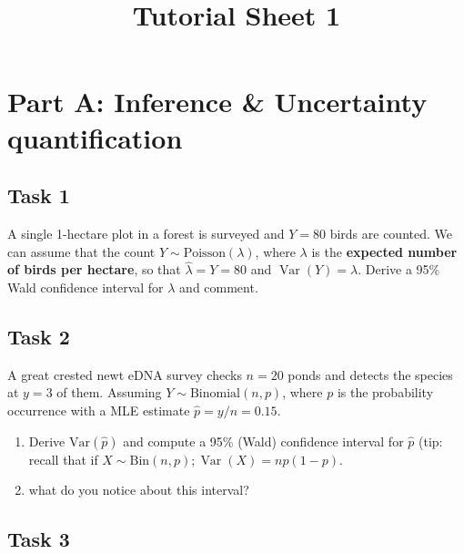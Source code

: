 \documentclass[
  letterpaper,
  DIV=11,
  numbers=noendperiod]{scrartcl}
\title{Tutorial Sheet 1}
\author{}
\date{}
\makeatletter
\providecommand{\tightlist}{%
  \setlength{\itemsep}{0pt}\setlength{\parskip}{0pt}}\usepackage{longtable,booktabs,array}
\renewcommand{\maketitle}{\bgroup\setlength{\parindent}{0pt}
\begin{flushleft}
  {\color{uniblue}\sffamily\huge\textbf{\@title}} \vspace{0.3cm} \newline
  {\Large {\@subtitle}} \newline
  \@author
\end{flushleft}\egroup
}
\makeatother
\begin{document}
\maketitle

\pagestyle{mystyle}


\section{Part A: Inference \& Uncertainty
quantification}\label{part-a-inference-uncertainty-quantification}

\subsection*{Task 1}\label{task-1}

A single 1-hectare plot in a forest is surveyed and \(Y = 80\) birds are
counted. We can assume that the count
\(Y \sim \text{Poisson}(\lambda)\), where \(\lambda\) is the
\textbf{expected number of birds per hectare}, so that
\(\hat\lambda = Y = 80\) and \(\operatorname{Var}(Y) = \lambda\). Derive
a 95\% Wald confidence interval for \(\lambda\) and comment.

\subsection*{Task 2}\label{task-2}

A great crested newt eDNA survey checks \(n = 20\) ponds and detects the
species at \(y = 3\) of them. Assuming \(Y \sim \text{Binomial}(n, p)\),
where \(p\) is the probability occurrence with a MLE estimate
\(\hat p = y/n = 0.15\).

\begin{enumerate}
\def\labelenumi{(\alph{enumi})}
\tightlist
\item
  Derive \(\text{Var}(\hat p)\) and compute a 95\% (Wald) confidence
  interval for \(\hat p\) (tip: recall that if
  \(X\sim\text{Bin}(n,p); \operatorname{Var}(X)=np(1-p)\).
\item
  what do you notice about this interval?
\end{enumerate}

\subsection*{Task 3}\label{task-3}
\end{document}
